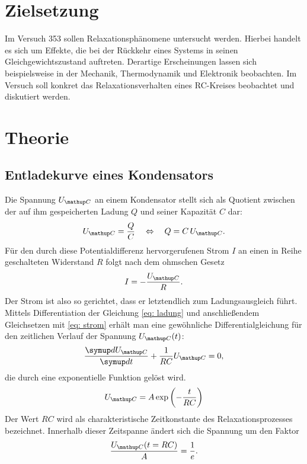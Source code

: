 \setcounter{page}{1}
\section*{Zielsetzung}
Im Versuch 353 sollen Relaxationsphänomene untersucht werden. Hierbei handelt es sich um Effekte, die bei der Rückkehr eines
Systems in seinen Gleichgewichtszustand auftreten. Derartige Erscheinungen lassen sich beispielsweise in der Mechanik, Thermodynamik
und Elektronik beobachten. Im Versuch soll konkret das Relaxationsverhalten eines RC-Kreises beobachtet und diskutiert werden.
\section{Theorie}
\subsection{Entladekurve eines Kondensators}
Die Spannung $U\ua{C}$ an einem Kondensator stellt sich als Quotient zwischen der auf ihm gespeicherten Ladung $Q$ und seiner Kapazität $C$ dar:
\begin{equation}
  U\ua{C} = \frac{Q}{C} \quad \Leftrightarrow \quad Q = C\, U\ua{C}.
  \label{eq: ladung}
\end{equation}
Für den durch diese Potentialdifferenz hervorgerufenen Strom $I$ an einen in Reihe geschalteten Widerstand $R$ folgt nach dem ohmschen Gesetz %
\begin{equation}
  I = -\frac{U\ua{C}}{R}.
  \label{eq: strom}
\end{equation}
Der Strom ist also so gerichtet, dass er letztendlich zum Ladungsausgleich führt. Mittels Differentiation der Gleichung \eqref{eq: ladung} und anschließendem
Gleichsetzen mit \eqref{eq: strom} erhält
man eine gewöhnliche Differentialgleichung für den zeitlichen Verlauf der Spannung $U\ua{C}(t)$:
\begin{equation}
  \frac{\dif{U\ua{C}}}{\dif{t}} + \frac{1}{RC}U\ua{C} = 0,
\end{equation}
die durch eine exponentielle Funktion gelöst wird.
\begin{equation}
  \label{eq:entlade_kurve}
  U\ua{C} = A \exp\left(-\frac{t}{RC}\right)
\end{equation}
Der Wert $RC$ wird als charakteristische Zeitkonstante des Relaxationsprozesses bezeichnet. Innerhalb dieser Zeitspanne ändert %
sich die Spannung um den Faktor
\begin{equation}
  \frac{U\ua{C}(t = RC)}{A} = \frac{1}{e}.
\end{equation}
